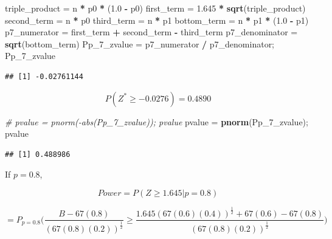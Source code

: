 \documentclass[]{article}
\newenvironment{Shaded}{\begin{snugshade}}{\end{snugshade}}
\newcommand{\CommentTok}[1]{\textcolor[rgb]{0.56,0.35,0.01}{\textit{#1}}}
\newcommand{\DecValTok}[1]{\textcolor[rgb]{0.00,0.00,0.81}{#1}}
\newcommand{\FloatTok}[1]{\textcolor[rgb]{0.00,0.00,0.81}{#1}}
\newcommand{\KeywordTok}[1]{\textcolor[rgb]{0.13,0.29,0.53}{\textbf{#1}}}
\newcommand{\NormalTok}[1]{#1}
\newcommand{\OperatorTok}[1]{\textcolor[rgb]{0.81,0.36,0.00}{\textbf{#1}}}
\newcommand{\StringTok}[1]{\textcolor[rgb]{0.31,0.60,0.02}{#1}}
\begin{document}
\begin{Shaded}
\begin{Highlighting}[]
\NormalTok{triple_product =}\StringTok{ }\NormalTok{n }\OperatorTok{*}\StringTok{ }\NormalTok{p0 }\OperatorTok{*}\StringTok{ }\NormalTok{(}\FloatTok{1.0} \OperatorTok{-}\StringTok{ }\NormalTok{p0)}
\NormalTok{first_term =}\StringTok{ }\FloatTok{1.645} \OperatorTok{*}\StringTok{ }\KeywordTok{sqrt}\NormalTok{(triple_product)}
\NormalTok{second_term =}\StringTok{ }\NormalTok{n }\OperatorTok{*}\StringTok{ }\NormalTok{p0}
\NormalTok{third_term =}\StringTok{ }\NormalTok{n }\OperatorTok{*}\StringTok{ }\NormalTok{p1}
\NormalTok{bottom_term =}\StringTok{ }\NormalTok{n }\OperatorTok{*}\StringTok{ }\NormalTok{p1 }\OperatorTok{*}\StringTok{ }\NormalTok{(}\FloatTok{1.0} \OperatorTok{-}\StringTok{ }\NormalTok{p1)}
\NormalTok{p7_numerator =}\StringTok{ }\NormalTok{first_term }\OperatorTok{+}\StringTok{ }\NormalTok{second_term }\OperatorTok{-}\StringTok{ }\NormalTok{third_term}
\NormalTok{p7_denominator =}\StringTok{ }\KeywordTok{sqrt}\NormalTok{(bottom_term)}
\NormalTok{Pp_}\DecValTok{7}\NormalTok{_zvalue =}\StringTok{ }\NormalTok{p7_numerator }\OperatorTok{/}\StringTok{ }\NormalTok{p7_denominator; Pp_}\DecValTok{7}\NormalTok{_zvalue}
\end{Highlighting}
\end{Shaded}

\begin{verbatim}
## [1] -0.02761144
\end{verbatim}

\[
    P(Z^* \geq -0.0276) = 0.4890
\]

\begin{Shaded}
\begin{Highlighting}[]
\CommentTok{# pvalue = pnorm(-abs(Pp_7_zvalue)); pvalue}
\NormalTok{pvalue =}\StringTok{ }\KeywordTok{pnorm}\NormalTok{(Pp_}\DecValTok{7}\NormalTok{_zvalue); pvalue}
\end{Highlighting}
\end{Shaded}

\begin{verbatim}
## [1] 0.488986
\end{verbatim}

If \(p = 0.8\),

\[
    Power = P(Z \geq 1.645 | p = 0.8)
\]

\[
    = P_{p=0.8}\bigg(\frac{B - 67(0.8)}{(67(0.8)(0.2))^{\frac{1}{2}}} \geq \frac{1.645(67(0.6)(0.4))^{\frac{1}{2}} + 67(0.6) - 67(0.8)}{(67(0.8)(0.2))^{\frac{1}{2}}}\bigg)
\]
\end{document}
